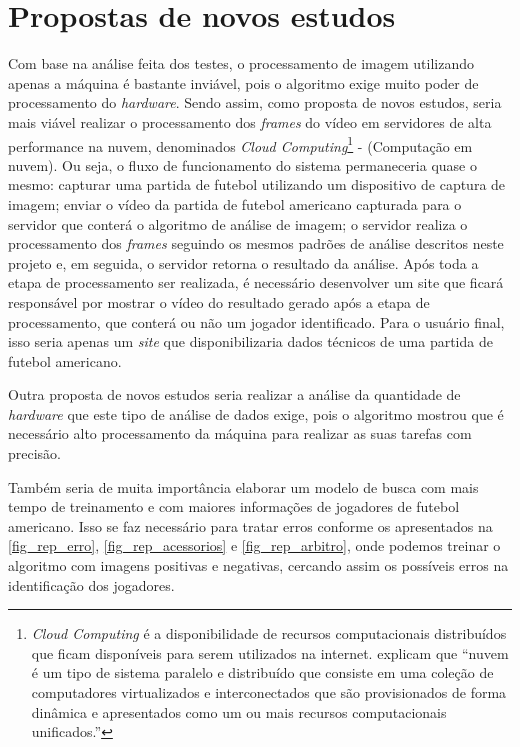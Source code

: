 \section{\textbf{Propostas de novos estudos}}
\label{novos_estudos}

Com base na análise feita dos testes, o processamento de imagem utilizando apenas a máquina é bastante inviável, pois o algoritmo exige muito poder de processamento do \textit{hardware}. Sendo assim, como proposta de novos estudos, seria mais viável realizar o processamento dos \textit{frames} do vídeo em servidores de alta performance na nuvem, denominados \textit{Cloud Computing}\footnote{\textit{Cloud Computing} é a disponibilidade de recursos computacionais distribuídos que ficam disponíveis para serem utilizados na internet.  explicam que “nuvem é um tipo de sistema paralelo e distribuído que consiste em uma coleção de computadores virtualizados e interconectados que são provisionados de forma dinâmica e apresentados como um ou mais recursos computacionais unificados.”} - (Computação em nuvem). Ou seja,  o fluxo de funcionamento do sistema permaneceria quase o mesmo: capturar uma partida de futebol utilizando um dispositivo de captura de imagem; enviar o vídeo da partida de futebol americano capturada para o servidor que conterá o algoritmo de análise de imagem; o servidor realiza o processamento dos \textit{frames} seguindo os mesmos padrões de análise descritos neste projeto e, em seguida, o servidor retorna o resultado da análise. Após toda a etapa de processamento ser realizada, é necessário desenvolver um site que ficará responsável por mostrar o vídeo do resultado gerado após a etapa de processamento, que conterá ou não um jogador identificado. Para o usuário final, isso seria apenas um \textit{site} que disponibilizaria dados técnicos de uma partida de futebol americano.

Outra proposta de novos estudos seria realizar a análise da quantidade de \textit{hardware} que este tipo de análise de dados exige, pois o algoritmo mostrou que é necessário alto processamento da máquina para realizar as suas tarefas com precisão.

Também seria de muita importância elaborar um modelo de busca com mais tempo de treinamento e com maiores informações de jogadores de futebol americano. Isso se faz necessário para tratar erros conforme os apresentados na \autoref{fig_rep_erro}, \autoref{fig_rep_acessorios} e \autoref{fig_rep_arbitro}, onde podemos treinar o algoritmo com imagens positivas e negativas, cercando assim os possíveis erros na identificação dos jogadores.